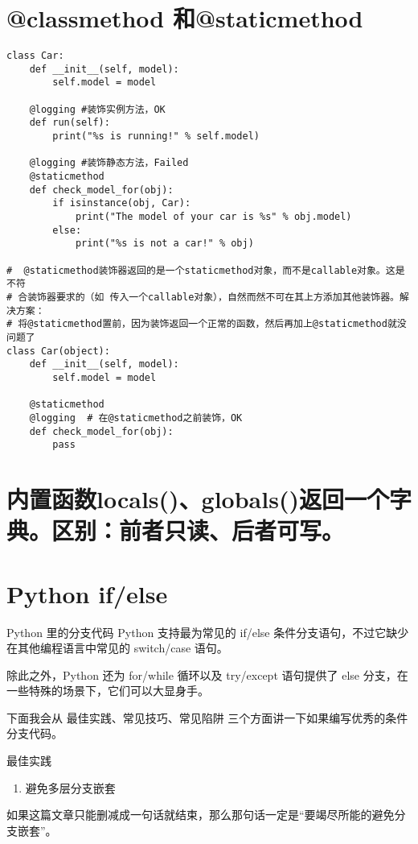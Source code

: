 \documentclass[11pt]{article}
\begin{document}
\section{@classmethod 和@staticmethod}
\label{sec:orgb0e8563}

\begin{verbatim}
class Car:
    def __init__(self, model):
        self.model = model

    @logging #装饰实例方法，OK
    def run(self):
        print("%s is running!" % self.model)

    @logging #装饰静态方法，Failed
    @staticmethod
    def check_model_for(obj):
        if isinstance(obj, Car):
            print("The model of your car is %s" % obj.model)
        else:
            print("%s is not a car!" % obj)

#  @staticmethod装饰器返回的是一个staticmethod对象，而不是callable对象。这是不符
# 合装饰器要求的（如 传入一个callable对象），自然而然不可在其上方添加其他装饰器。解决方案：
# 将@staticmethod置前，因为装饰返回一个正常的函数，然后再加上@staticmethod就没问题了
class Car(object):
    def __init__(self, model):
        self.model = model

    @staticmethod
    @logging  # 在@staticmethod之前装饰，OK
    def check_model_for(obj):
        pass

\end{verbatim}

\section{内置函数locals()、globals()返回一个字典。区别：前者只读、后者可写。}
\label{sec:org264a5e5}

\section{Python if/else}
\label{sec:org5c47304}
  Python 里的分支代码
Python 支持最为常见的 if/else 条件分支语句，不过它缺少在其他编程语言中常见的 switch/case 语句。

除此之外，Python 还为 for/while 循环以及 try/except 语句提供了 else 分支，在一些特殊的场景下，它们可以大显身手。

下面我会从 最佳实践、常见技巧、常见陷阱 三个方面讲一下如果编写优秀的条件分支代码。

最佳实践
\begin{enumerate}
\item 避免多层分支嵌套
\end{enumerate}
如果这篇文章只能删减成一句话就结束，那么那句话一定是“要竭尽所能的避免分支嵌套”。
\end{document}
